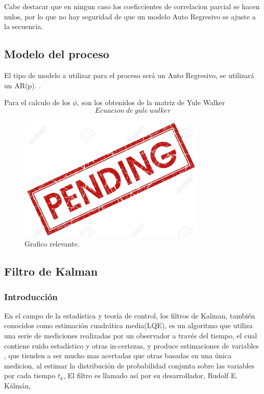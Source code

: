 Cabe destacar que en ningun caso los coeficcientes de correlacion parcial se hacen nulos, por lo que no hay seguridad de que un modelo Auto Regresivo se ajuste a la secuencia.
\subsection{Modelo del proceso}
\label{subsec:modelo}

El tipo de modelo a utilizar para el proceso será un Auto Regresivo, se utilizará un AR(p). .

Para el calculo de los $\phi$, son los obtenidos de la matriz de Yule Walker
\begin{equation}
Ecuacion \ de \ yule \  walker
\end{equation}


\begin{figure}[H]
\centering

	\includegraphics[width=0.8\textwidth, trim = {0 0 0 0.},clip]{./Imagenes/pend.jpg}
	\caption{Grafico relevante.}

	\label{fig:Rxxcalc}
\end{figure}


\subsection{Filtro de Kalman}
\subsubsection{Introducción}
En el campo de la estadística y teoría de control, los filtros de Kalman, también conocidos como estimación cuadrática media(LQE), es un algoritmo que utiliza una serie de mediciones realizadas por un observador a través del tiempo, el cual contiene ruido estadístico y otras in-certezas, y  produce estimaciones de variables , que tienden a ser mucho mas acertadas que otras basadas en una única medicion, al estimar la distribución de probabilidad conjunta sobre las variables por cada tiempo $t_k$, El filtro es llamado así por su desarrollador, Rudolf E. Kálmán,


